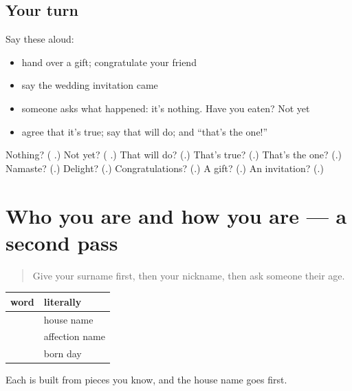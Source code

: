 \subsection*{Your turn}
Say these aloud:

\begin{itemize}
\raggedright
  \item hand over a gift; congratulate your friend
  \item say the wedding invitation came
  \item someone asks what happened: it's nothing. Have you eaten? Not yet
  \item agree that it's true; say that will do; and \textquotedblleft{}that's the one!\textquotedblright{}
\end{itemize}

\begin{tcolorbox}[breakable,colback=teal!4,colframe=teal!35!black,title={Before you move on}]
Nothing? (\textbf{ }.) Not yet? (\textbf{ }.) That will do? (\textbf{}.) That's true? (\textbf{}.) That's the one? (\textbf{}.) Namaste? (\textbf{}.) Delight? (\textbf{}.) Congratulations? (\textbf{}.) A gift? (\textbf{}.) An invitation? (\textbf{}.)
\end{tcolorbox}
\section[(dialogue)]{Who you are and how you are — a second pass}

\label{lesson:TE-R99-second-pass-names-moods}



\begin{quote}
Give your surname first, then your nickname, then ask someone their age.
\end{quote}

\begin{grammarlens}[title={Grammar Lens: a name in two parts}]
\noindent
\begin{tabularx}{\linewidth}{@{}>{\raggedright\arraybackslash}X>{\raggedright\arraybackslash}X@{}}
\toprule
\textbf{word} & \textbf{literally} \\
\midrule
\textbf{\te{ఇంటిపేరు}} & house name \\
\textbf{\te{ముద్దుపేరు}} & affection name \\
\textbf{\te{పుట్టినరోజు}} & born day \\
\bottomrule
\end{tabularx}

Each is built from pieces you know, and the house name goes first.
\end{grammarlens}

